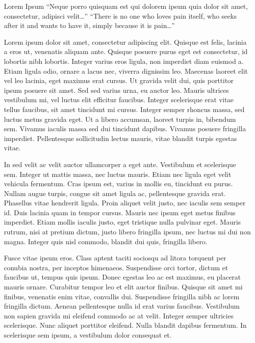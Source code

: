 \documentclass[
  11pt,
  a4paper,
]{scrreprt}
\begin{document}
Lorem Ipsum ``Neque porro quisquam est qui dolorem ipsum quia dolor sit
amet, consectetur, adipisci velit\ldots{}'' ``There is no one who loves
pain itself, who seeks after it and wants to have it, simply because it
is pain\ldots{}''

Lorem ipsum dolor sit amet, consectetur adipiscing elit. Quisque est
felis, lacinia a eros ut, venenatis aliquam ante. Quisque posuere purus
eget est consectetur, id lobortis nibh lobortis. Integer varius eros
ligula, non imperdiet diam euismod a. Etiam ligula odio, ornare a lacus
nec, viverra dignissim leo. Maecenas laoreet elit vel leo lacinia, eget
maximus erat cursus. Ut gravida velit dui, quis porttitor ipsum posuere
sit amet. Sed sed varius urna, eu auctor leo. Mauris ultrices vestibulum
mi, vel luctus elit efficitur faucibus. Integer scelerisque erat vitae
tellus faucibus, sit amet tincidunt mi cursus. Integer semper rhoncus
massa, sed luctus metus gravida eget. Ut a libero accumsan, laoreet
turpis in, bibendum sem. Vivamus iaculis massa sed dui tincidunt
dapibus. Vivamus posuere fringilla imperdiet. Pellentesque sollicitudin
lectus mauris, vitae blandit turpis egestas vitae.

In sed velit ac velit auctor ullamcorper a eget ante. Vestibulum et
scelerisque sem. Integer ut mattis massa, nec luctus mauris. Etiam nec
ligula eget velit vehicula fermentum. Cras ipsum est, varius in mollis
eu, tincidunt eu purus. Nullam augue turpis, congue sit amet ligula ac,
pellentesque gravida erat. Phasellus vitae hendrerit ligula. Proin
aliquet velit justo, nec iaculis sem semper id. Duis lacinia quam in
tempor cursus. Mauris nec ipsum eget metus finibus imperdiet. Etiam
mollis iaculis justo, eget tristique nulla pulvinar eget. Mauris rutrum,
nisi at pretium dictum, justo libero fringilla ipsum, nec luctus mi dui
non magna. Integer quis nisl commodo, blandit dui quis, fringilla
libero.

Fusce vitae ipsum eros. Class aptent taciti sociosqu ad litora torquent
per conubia nostra, per inceptos himenaeos. Suspendisse orci tortor,
dictum et faucibus ut, tempus quis ipsum. Donec egestas leo ac est
maximus, eu placerat mauris ornare. Curabitur tempor leo et elit auctor
finibus. Quisque sit amet mi finibus, venenatis enim vitae, convallis
dui. Suspendisse fringilla nibh ac lorem fringilla dictum. Aenean
pellentesque nulla id erat varius faucibus. Vestibulum non sapien
gravida mi eleifend commodo ac at velit. Integer semper ultricies
scelerisque. Nunc aliquet porttitor eleifend. Nulla blandit dapibus
fermentum. In scelerisque sem ipsum, a vestibulum dolor consequat et.
\end{document}
